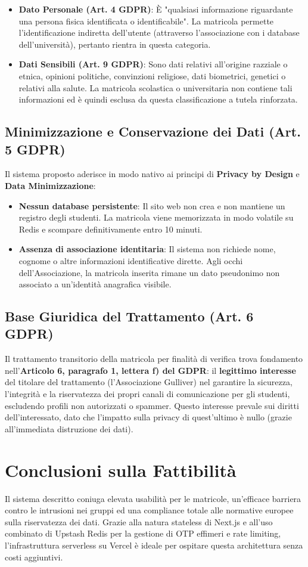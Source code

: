 \documentclass[11pt,a4paper,oneside]{article}
\begin{document}
\begin{itemize}
    \item \textbf{Dato Personale (Art. 4 GDPR)}: È "qualsiasi informazione riguardante una persona fisica identificata o identificabile". La matricola permette l'identificazione indiretta dell'utente (attraverso l'associazione con i database dell'università), pertanto rientra in questa categoria.
    \item \textbf{Dati Sensibili (Art. 9 GDPR)}: Sono dati relativi all'origine razziale o etnica, opinioni politiche, convinzioni religiose, dati biometrici, genetici o relativi alla salute. La matricola scolastica o universitaria non contiene tali informazioni ed è quindi esclusa da questa classificazione a tutela rinforzata.
\end{itemize}

\subsection{Minimizzazione e Conservazione dei Dati (Art. 5 GDPR)}
Il sistema proposto aderisce in modo nativo ai principi di \textbf{Privacy by Design} e \textbf{Data Minimizzazione}:
\begin{itemize}
    \item \textbf{Nessun database persistente}: Il sito web non crea e non mantiene un registro degli studenti. La matricola viene memorizzata in modo volatile su Redis e scompare definitivamente entro 10 minuti.
    \item \textbf{Assenza di associazione identitaria}: Il sistema non richiede nome, cognome o altre informazioni identificative dirette. Agli occhi dell'Associazione, la matricola inserita rimane un dato pseudonimo non associato a un'identità anagrafica visibile.
\end{itemize}

\subsection{Base Giuridica del Trattamento (Art. 6 GDPR)}
Il trattamento transitorio della matricola per finalità di verifica trova fondamento nell'\textbf{Articolo 6, paragrafo 1, lettera f) del GDPR}: il \textbf{legittimo interesse} del titolare del trattamento (l'Associazione Gulliver) nel garantire la sicurezza, l'integrità e la riservatezza dei propri canali di comunicazione per gli studenti, escludendo profili non autorizzati o spammer. Questo interesse prevale sui diritti dell'interessato, dato che l'impatto sulla privacy di quest'ultimo è nullo (grazie all'immediata distruzione dei dati).

\section{Conclusioni sulla Fattibilità}
Il sistema descritto coniuga elevata usabilità per le matricole, un'efficace barriera contro le intrusioni nei gruppi ed una compliance totale alle normative europee sulla riservatezza dei dati. Grazie alla natura stateless di Next.js e all'uso combinato di Upstash Redis per la gestione di OTP effimeri e rate limiting, l'infrastruttura serverless su Vercel è ideale per ospitare questa architettura senza costi aggiuntivi.
\end{document}

